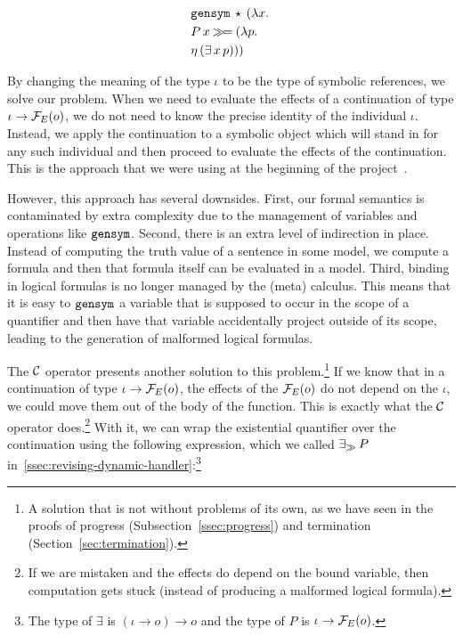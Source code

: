 \begin{align*}
  &\mathtt{gensym}\,\star\,(\lambda x.\,  \\
  &P\,x \mathbin{\gg\!=} (\lambda p.\,  \\
  &\eta\,(\exists\,x\,p)))
\end{align*}

By changing the meaning of the type $\iota$ to be the type of symbolic
references, we solve our problem. When we need to evaluate the effects of a
continuation of type $\iota \to \mathcal{F}_E(o)$, we do not need to know the
precise identity of the individual $\iota$. Instead, we apply the
continuation to a symbolic object which will stand in for any such
individual and then proceed to evaluate the effects of the
continuation. This is the approach that we were using at the beginning of
the project~\cite{marsik2014algebraic}.

However, this approach has several downsides. First, our formal semantics
is contaminated by extra complexity due to the management of variables and
operations like $\mathtt{gensym}$. Second, there is an extra level of
indirection in place. Instead of computing the truth value of a sentence in
some model, we compute a formula and then that formula itself can be
evaluated in a model. Third, binding in logical formulas is no longer
managed by the (meta) calculus. This means that it is easy to $\mathtt{gensym}$
a variable that is supposed to occur in the scope of a quantifier and then
have that variable accidentally project outside of its scope, leading to
the generation of malformed logical formulas.

The $\mathcal{C}$ operator presents another solution to this problem.\footnote{A
  solution that is not without problems of its own, as we have seen in the
  proofs of progress (Subsection~\ref{ssec:progress}) and termination
  (Section~\ref{sec:termination}).}  If we know that in a continuation of
type $\iota \to \mathcal{F}_E(o)$, the effects of the $\mathcal{F}_E(o)$ do not depend on
the $\iota$, we could move them out of the body of the function. This is
exactly what the $\mathcal{C}$ operator does.\footnote{If we are mistaken and the
  effects do depend on the bound variable, then computation gets stuck
  (instead of producing a malformed logical formula).} With it, we can wrap
the existential quantifier over the continuation using the following
expression, which we called $\mathop{\exists_\gg} P$
in~\ref{ssec:revising-dynamic-handler}:\footnote{The type of $\exists$ is
  $(\iota \to o) \to o$ and the type of $P$ is $\iota \to \mathcal{F}_E(o)$.}


